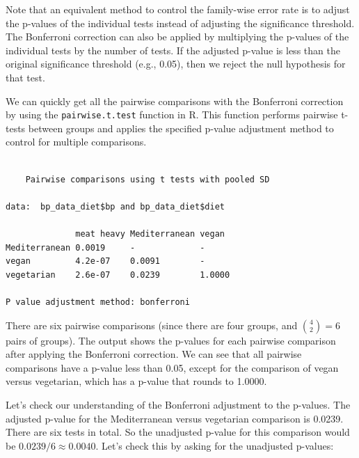 \documentclass[
  letterpaper,
  8pt,
  a4paper]{book}
\newenvironment{Shaded}{\begin{snugshade}}{\end{snugshade}}
\newcommand{\AttributeTok}[1]{\textcolor[rgb]{0.40,0.45,0.13}{#1}}
\newcommand{\FunctionTok}[1]{\textcolor[rgb]{0.28,0.35,0.67}{#1}}
\newcommand{\NormalTok}[1]{\textcolor[rgb]{0.00,0.23,0.31}{#1}}
\newcommand{\SpecialCharTok}[1]{\textcolor[rgb]{0.37,0.37,0.37}{#1}}
\newcommand{\StringTok}[1]{\textcolor[rgb]{0.13,0.47,0.30}{#1}}
\begin{document}
Note that an equivalent method to control the family-wise error rate is
to adjust the p-values of the individual tests instead of adjusting the
significance threshold. The Bonferroni correction can also be applied by
multiplying the p-values of the individual tests by the number of tests.
If the adjusted p-value is less than the original significance threshold
(e.g., 0.05), then we reject the null hypothesis for that test.

We can quickly get all the pairwise comparisons with the Bonferroni
correction by using the \texttt{pairwise.t.test} function in R. This
function performs pairwise t-tests between groups and applies the
specified p-value adjustment method to control for multiple comparisons.

\begin{Shaded}
\end{Shaded}

\begin{verbatim}

    Pairwise comparisons using t tests with pooled SD 

data:  bp_data_diet$bp and bp_data_diet$diet 

              meat heavy Mediterranean vegan 
Mediterranean 0.0019     -             -     
vegan         4.2e-07    0.0091        -     
vegetarian    2.6e-07    0.0239        1.0000

P value adjustment method: bonferroni 
\end{verbatim}

There are six pairwise comparisons (since there are four groups, and
\(\binom{4}{2} = 6\) pairs of groups). The output shows the p-values for
each pairwise comparison after applying the Bonferroni correction. We
can see that all pairwise comparisons have a p-value less than 0.05,
except for the comparison of vegan versus vegetarian, which has a
p-value that rounds to 1.0000.

Let's check our understanding of the Bonferroni adjustment to the
p-values. The adjusted p-value for the Mediterranean versus vegetarian
comparison is 0.0239. There are six tests in total. So the unadjusted
p-value for this comparison would be \(0.0239 / 6 \approx 0.0040\).
Let's check this by asking for the unadjusted p-values:
\end{document}

